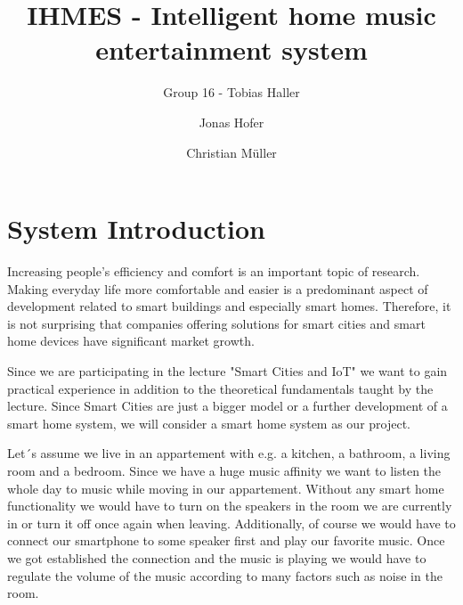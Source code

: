 \documentclass[runningheads]{llncs}
\begin{document}
%
\title{IHMES - Intelligent home music entertainment system}


\author{Group 16 - Tobias Haller \and Jonas Hofer \and Christian M\"uller}


%
\maketitle              %
%
%    

\section{System Introduction}

Increasing people's efficiency and comfort is an important topic of research. Making everyday life more comfortable and easier is a predominant aspect of development related to smart buildings and especially smart homes.
Therefore, it is not surprising that companies offering solutions for smart cities and smart home devices have significant market growth. 

Since we are participating in the lecture "Smart Cities and IoT" we want to gain practical experience in addition to the theoretical fundamentals taught by the lecture. Since Smart Cities are just a bigger model or a further development of a smart home system, we will consider a smart home system as our project. 

Let´s assume we live in an appartement with e.g. a kitchen, a bathroom, a living room and a bedroom. Since we have a huge music affinity we want to listen the whole day to music while moving in our appartement. Without any smart home functionality we would have to turn on the speakers in the room we are currently in or turn it off once again when leaving. Additionally, of course we would have to connect our smartphone to some speaker first and play our favorite music. Once we got established the connection and the music is playing we would have to regulate the volume of the music according to many factors such as noise in the room. 
\end{document}
